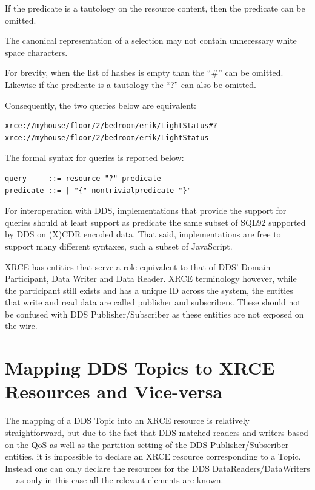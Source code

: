 \documentclass[a4paper,oneside,article]{memoir}
\begin{document}
If the predicate is a tautology on the resource content, then the predicate can be omitted.

The canonical representation of a selection may not contain unnecessary white space characters.

For brevity, when the list of hashes is empty than the ``\#'' can be omitted. Likewise if the
predicate is a tautology the ``?'' can also be omitted.

Consequently, the two queries below are equivalent:
\begin{verbatim}
xrce://myhouse/floor/2/bedroom/erik/LightStatus#?
xrce://myhouse/floor/2/bedroom/erik/LightStatus
\end{verbatim}

The formal syntax for queries is reported below:

\begin{verbatim}
query     ::= resource "?" predicate
predicate ::= | "{" nontrivialpredicate "}"
\end{verbatim}

For interoperation with DDS, implementations that provide the support for queries should at least
support as predicate the same subset of SQL92 supported by DDS on (X)CDR encoded data.  That said,
implementations are free to support many different syntaxes, such a subset of JavaScript.

XRCE has entities that serve a role equivalent to that of DDS' Domain Participant, Data Writer and
Data Reader.  XRCE terminology however, while the participant still exists and has a unique ID
across the system, the entities that write and read data are called publisher and subscribers. These
should not be confused with DDS Publisher/Subscriber as these entities are not exposed on the wire.

\section{Mapping DDS Topics to XRCE Resources and Vice-versa}

The mapping of a DDS Topic into an XRCE resource is relatively straightforward, but due to the fact
that DDS matched readers and writers based on the QoS as well as the partition setting of the DDS
Publisher/Subscriber entities, it is impossible to declare an XRCE resource corresponding to a
Topic. Instead one can only declare the resources for the DDS DataReaders/DataWriters — as only in
this case all the relevant elements are known.
\end{document}
